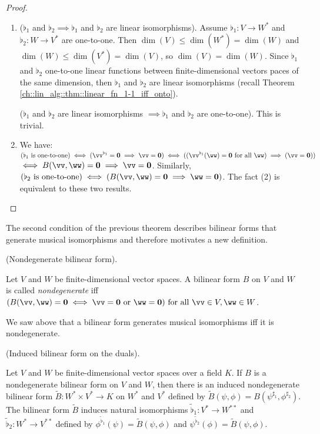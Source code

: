 \begin{proof}
    \mbox{} \\
    \begin{enumerate}
        \item ($\flat_1$ and $\flat_2 \implies \flat_1$ and $\flat_2$ are linear isomorphisms). Assume $\flat_1:V \rightarrow W^*$ and $\flat_2:W \rightarrow V^*$ are one-to-one. Then $\dim(V) \leq \dim(W^*) = \dim(W)$ and $\dim(W) \leq \dim(V^*) = \dim(V)$, so $\dim(V) = \dim(W)$. Since $\flat_1$ and $\flat_2$ one-to-one linear functions between finite-dimensional vectors paces of the same dimension, then $\flat_1$ and $\flat_2$ are linear isomorphisms (recall Theorem \ref{ch::lin_alg::thm::linear_fn_1-1_iff_onto}).

        ($\flat_1$ and $\flat_2$ are linear isomorphisms $\implies \flat_1$ and $\flat_2$ are one-to-one). This is trivial.
        
        \item We have: $(\flat_1 \text{ is one-to-one}) \iff (\vv^{\flat_1} = \mathbf{0} \implies \vv = \mathbf{0}) \iff ((\vv^{\flat_1}(\ww) = \mathbf{0} \text{ for all $\ww$}) \implies (\vv = \mathbf{0}))$ \\ $\iff B(\vv, \ww) = \mathbf{0} \implies \vv = \mathbf{0}$. Similarly, $(\flat_2 \text{ is one-to-one}) \iff (B(\vv, \ww) = \mathbf{0} \implies \ww = \mathbf{0})$. The fact (2) is equivalent to these two results.
    \end{enumerate}
\end{proof}

The second condition of the previous theorem describes bilinear forms that generate musical isomorphisms and therefore motivates a new definition.

\begin{defn}
    (Nondegenerate bilinear form).
    
    Let $V$ and $W$ be finite-dimensional vector spaces. A bilinear form $B$ on $V$ and $W$ is called \textit{nondegenerate} iff $(B(\vv, \ww) = \mathbf{0} \iff \vv = \mathbf{0} \text{ or } \ww = \mathbf{0}) \text{ for all } \vv \in V, \ww \in W$.

    We saw above that a bilinear form generates musical isomorphisms iff it is nondegenerate.
\end{defn}

\begin{theorem}
\label{ch::bilinear_forms_metric_tensors::induced_bilinear_form_on_duals}
    (Induced bilinear form on the duals).
    
    Let $V$ and $W$ be finite-dimensional vector spaces over a field $K$. If $B$ is a nondegenerate bilinear form on $V$ and $W$, then there is an induced nondegenerate bilinear form $\widetilde{B}:W^* \times V^* \rightarrow K$ on $W^*$ and $V^*$ defined by $\widetilde{B}(\psi, \phi) = B(\psi^{\sharp_1}, \phi^{\sharp_2})$. The bilinear form $\widetilde{B}$ induces natural isomorphisms $\widetilde{\flat}_1:V^* \rightarrow W^{**}$ and $\widetilde{\flat}_2:W^* \rightarrow V^{**}$ defined by $\phi^{\widetilde{\flat}_1}(\psi) = \widetilde{B}(\psi, \phi)$ and $\psi^{\widetilde{\flat}_2}(\phi) = \widetilde{B}(\psi, \phi)$.
\end{theorem}

